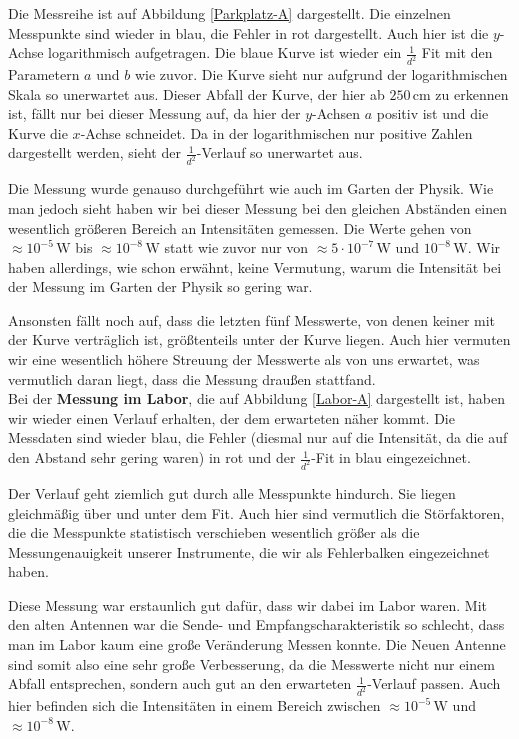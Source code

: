\documentclass[titlepage,11pt,a4paper,ngerman]{article}
\newcommand{\tx}[1]{\textrm{#1}}
\begin{document}
Die Messreihe ist auf Abbildung \ref{Parkplatz-A} dargestellt. Die einzelnen Messpunkte sind wieder in blau, die Fehler in rot dargestellt. Auch hier ist die $ y $-Achse logarithmisch aufgetragen. Die blaue Kurve ist wieder ein $ \frac{1}{d^2} $ Fit mit den Parametern $ a $ und $ b $ wie zuvor. Die Kurve sieht nur aufgrund der logarithmischen Skala so unerwartet aus. Dieser Abfall der Kurve, der hier ab $ 250 \, \tx{cm} $ zu erkennen ist, fällt nur bei dieser Messung auf, da hier der $ y $-Achsen $ a $ positiv ist und die Kurve die $ x $-Achse schneidet. Da in der logarithmischen nur positive Zahlen dargestellt werden, sieht der $ \frac{1}{d^2} $-Verlauf so unerwartet aus.\par
Die Messung wurde genauso durchgeführt wie auch im Garten der Physik. Wie man jedoch sieht haben wir bei dieser Messung bei den gleichen Abständen einen wesentlich größeren Bereich an Intensitäten gemessen. Die Werte gehen von $ \approx 10^{-5} \, \tx{W} $ bis $ \approx 10^{-8} \, \tx{W} $ statt wie zuvor nur von $ \approx 5 \cdot 10^{-7} \, \tx{W} $ und $ 10^{-8} \, \tx{W} $. Wir haben allerdings, wie schon erwähnt, keine Vermutung, warum die Intensität bei der Messung im Garten der Physik so gering war.\par
Ansonsten fällt noch auf, dass die letzten fünf Messwerte, von denen keiner mit der Kurve verträglich ist, größtenteils unter der Kurve liegen. Auch hier vermuten wir eine wesentlich höhere Streuung der Messwerte als von uns erwartet, was vermutlich daran liegt, dass die Messung draußen stattfand.\\[10pt]
\noindent
Bei der \textbf{Messung im Labor}, die auf Abbildung \ref{Labor-A} dargestellt ist, haben wir wieder einen Verlauf erhalten, der dem erwarteten näher kommt. Die Messdaten sind wieder blau, die Fehler (diesmal nur auf die Intensität, da die auf den Abstand sehr gering waren) in rot und der $ \frac{1}{d^2} $-Fit in blau eingezeichnet.\par
Der Verlauf geht ziemlich gut durch alle Messpunkte hindurch. Sie liegen gleichmäßig über und unter dem Fit. Auch hier sind vermutlich die Störfaktoren, die die Messpunkte statistisch verschieben wesentlich größer als die Messungenauigkeit unserer Instrumente, die wir als Fehlerbalken eingezeichnet haben.\par
Diese Messung war erstaunlich gut dafür, dass wir dabei im Labor waren. Mit den alten Antennen war die Sende- und Empfangscharakteristik so schlecht, dass man im Labor kaum eine große Veränderung Messen konnte. Die Neuen Antenne sind somit also eine sehr große Verbesserung, da die Messwerte nicht nur einem Abfall entsprechen, sondern auch gut an den erwarteten $ \frac{1}{d^2} $-Verlauf passen. Auch hier befinden sich die Intensitäten in einem Bereich zwischen $ \approx 10^{-5} \, \tx{W} $ und $ \approx 10^{-8} \, \tx{W} $.\\[10pt]
\end{document}
